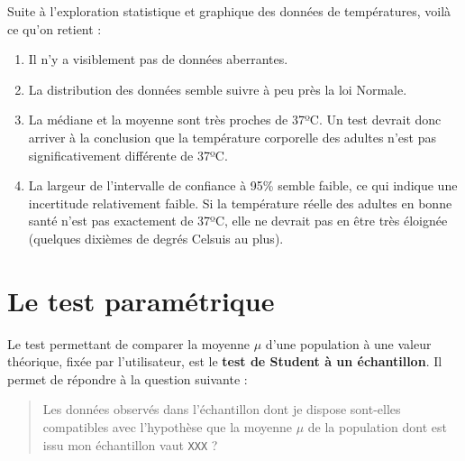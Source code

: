 \documentclass[
  french,
  a4paper,
  DIV=11,
  numbers=noendperiod,
  oneside]{scrreprt}
\providecommand{\tightlist}{%
  \setlength{\itemsep}{0pt}\setlength{\parskip}{0pt}}
\begin{document}
\begin{tcolorbox}[enhanced jigsaw, arc=.35mm, bottomrule=.15mm, bottomtitle=1mm, breakable, colback=white, colbacktitle=quarto-callout-note-color!10!white, colframe=quarto-callout-note-color-frame, coltitle=black, left=2mm, leftrule=.75mm, opacityback=0, opacitybacktitle=0.6, rightrule=.15mm, title=\textcolor{quarto-callout-note-color}{\faInfo}\hspace{0.5em}{Bilan des analyses préliminaires}, titlerule=0mm, toprule=.15mm, toptitle=1mm]

Suite à l'exploration statistique et graphique des données de
températures, voilà ce qu'on retient :

\begin{enumerate}
\def\labelenumi{\arabic{enumi}.}
\tightlist
\item
  Il n'y a visiblement pas de données aberrantes.
\item
  La distribution des données semble suivre à peu près la loi Normale.
\item
  La médiane et la moyenne sont très proches de 37ºC. Un test devrait
  donc arriver à la conclusion que la température corporelle des adultes
  n'est pas significativement différente de 37ºC.
\item
  La largeur de l'intervalle de confiance à 95\% semble faible, ce qui
  indique une incertitude relativement faible. Si la température réelle
  des adultes en bonne santé n'est pas exactement de 37ºC, elle ne
  devrait pas en être très éloignée (quelques dixièmes de degrés Celsuis
  au plus).
\end{enumerate}

\end{tcolorbox}

\section{Le test paramétrique}\label{le-test-paramuxe9trique}

Le test permettant de comparer la moyenne \(\mu\) d'une population à une
valeur théorique, fixée par l'utilisateur, est le \textbf{test de
Student à un échantillon}. Il permet de répondre à la question suivante
:

\begin{quote}
Les données observés dans l'échantillon dont je dispose sont-elles
compatibles avec l'hypothèse que la moyenne \(\mu\) de la population
dont est issu mon échantillon vaut \texttt{XXX} ?
\end{quote}
\end{document}
